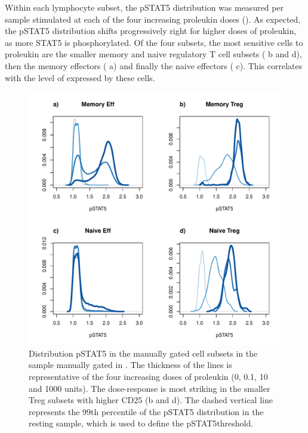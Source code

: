 Within each lymphocyte subset, the pSTAT5 distribution was measured per sample stimulated at each of the four increasing proleukin doses
().  
As expected, the pSTAT5 distribution shifts progressively right for higher doses of proleukin, as more STAT5 is phosphorylated.
Of the four subsets, the most sensitive cells to proleukin are the smaller memory and naive regulatory T cell subsets ( b and d),
then the memory effectors ( a) and finally the naive effectors ( c).
This correlates with the level of  expressed by these cells.
\begin{figure}[h]
\centering
\includegraphics[scale=.45]{figures/dose-effect-pstat5-cellsubsets-density.pdf}
{ Distribution pSTAT5 in the manually gated cell subsets in the sample manually gated in . }
{
The thickness of the lines is representative of the four increasing doses of proleukin (0, 0.1, 10 and 1000 units).
The dose-response is most striking in the smaller Treg subsets with higher CD25 (b and d).
The dashed vertical line represents the 99th percentile of the pSTAT5 distribution in the resting sample,
which is used to define the pSTAT5\positive threshold.
}
\end{figure}
